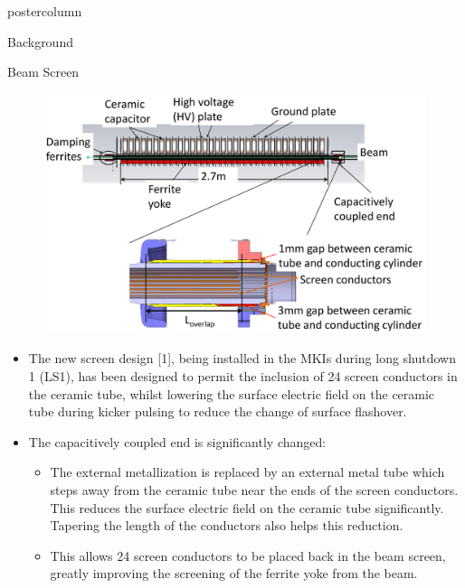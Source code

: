 \documentclass[final,hyperref={pdfpagelabels=false}]{beamer}
\begin{document}
\begin{frame}
\begin{columns}
\begin{column}{.49\textwidth}
\begin{beamercolorbox}[center,wd=\textwidth]{postercolumn}
\begin{minipage}[T]{.95\textwidth}
{\begin{block}{Background}
	\end{block}
 \vfill
	\begin{block}{Beam Screen}
\begin{figure}
\includegraphics[width=1.0\textwidth]{beamScreen.pdf}
\end{figure}
\begin{itemize}
\item{The new screen design [1], being installed  in the MKIs during long shutdown 1 (LS1), has been designed to permit the inclusion of 24 screen conductors in the ceramic tube, whilst lowering the surface electric field on the ceramic tube during kicker pulsing to reduce the change of surface flashover.}
\item{The capacitively coupled end is significantly changed:}
\begin{itemize}
\item{The external metallization is replaced by an external metal tube which steps away from the ceramic tube near the ends of the screen conductors. This reduces the surface electric field on the ceramic tube significantly. Tapering the length of the conductors also helps this reduction.}
\item{This allows 24 screen conductors to be placed back in the beam screen, greatly improving the screening of the ferrite yoke from the beam.}
\end{itemize}
\end{itemize}

	\end{block}

            \vfill

}
\end{minipage}
\end{beamercolorbox}
\end{column}
\end{columns}
\end{frame}
\end{document}
